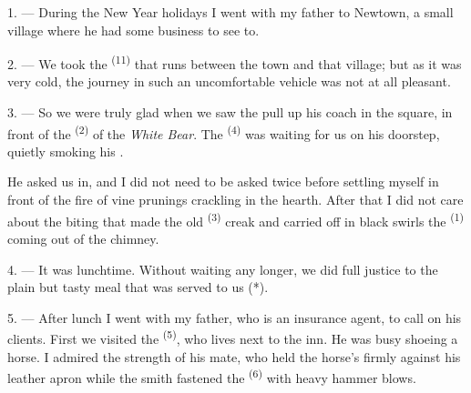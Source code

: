 

\VUsaut{4.0mm}
\VUsaut{3.0mm}
\VUfilet{16mm}
\VUsaut{5.6mm}
\VUsaut{3.0mm}

\VUsaut{3.0mm}

\VUsaut{4.0mm}

1. --- During the New Year holidays I went with my father to Newtown, a small village where he
had some business to see to.

2. --- We took the  \textsuperscript{(11)} that runs between the town and
that village; but as it was very cold, the journey in such an uncomfortable vehicle was not at
all pleasant.

3. --- So we were truly glad when we saw the  pull up his coach in the square,
in front of the  \textsuperscript{(2)} of the \textit{White Bear}. The
 \textsuperscript{(4)} was waiting for us on his doorstep, quietly smoking
his .

He asked us in, and I did not need to be asked twice before settling myself in front of the
fire of vine prunings crackling in the hearth. After that I did not care about the biting
 that made the old
 \textsuperscript{(3)} creak and carried off in black swirls the
 \textsuperscript{(1)} coming out of the chimney.

4. --- It was lunchtime. Without waiting any longer, we did full justice to the plain but
tasty meal that was served to us (*).

\VUsaut{3.0mm}

5. --- After lunch I went with my father, who is an insurance agent, to call on his clients.
First we visited the  \textsuperscript{(5)}, who lives next to the inn. He
was busy shoeing a horse. I admired the strength of his mate, who held the horse's
 firmly against his leather apron while the smith fastened the 
\textsuperscript{(6)} with heavy hammer blows.

